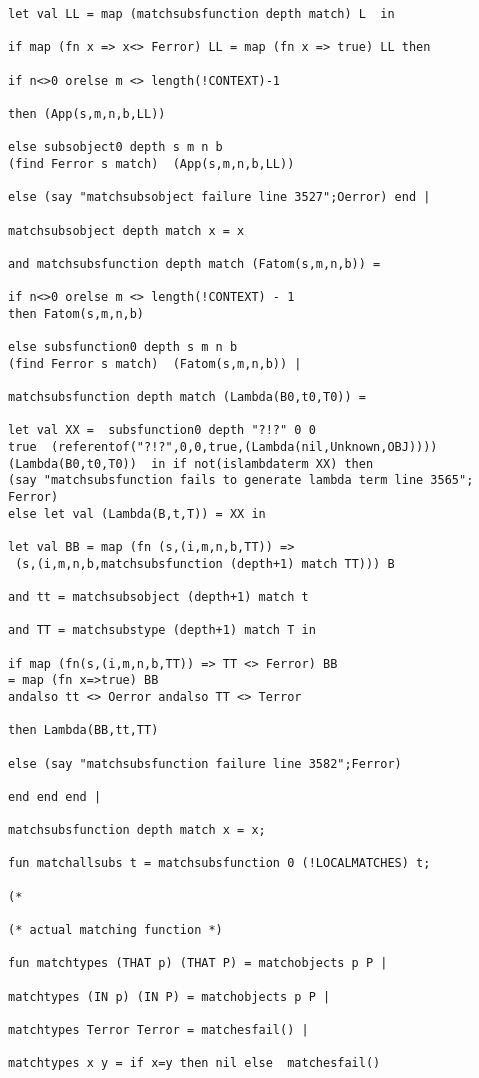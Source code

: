\documentclass[12pt]{article}
\begin{document}
\begin{verbatim}
let val LL = map (matchsubsfunction depth match) L  in

if map (fn x => x<> Ferror) LL = map (fn x => true) LL then

if n<>0 orelse m <> length(!CONTEXT)-1 

then (App(s,m,n,b,LL)) 

else subsobject0 depth s m n b 
(find Ferror s match)  (App(s,m,n,b,LL)) 

else (say "matchsubsobject failure line 3527";Oerror) end |

matchsubsobject depth match x = x

and matchsubsfunction depth match (Fatom(s,m,n,b)) =

if n<>0 orelse m <> length(!CONTEXT) - 1 
then Fatom(s,m,n,b)

else subsfunction0 depth s m n b 
(find Ferror s match)  (Fatom(s,m,n,b)) |

matchsubsfunction depth match (Lambda(B0,t0,T0)) =

let val XX =  subsfunction0 depth "?!?" 0 0 
true  (referentof("?!?",0,0,true,(Lambda(nil,Unknown,OBJ))))
(Lambda(B0,t0,T0))  in if not(islambdaterm XX) then  
(say "matchsubsfunction fails to generate lambda term line 3565";
Ferror)
else let val (Lambda(B,t,T)) = XX in

let val BB = map (fn (s,(i,m,n,b,TT)) =>
 (s,(i,m,n,b,matchsubsfunction (depth+1) match TT))) B

and tt = matchsubsobject (depth+1) match t

and TT = matchsubstype (depth+1) match T in

if map (fn(s,(i,m,n,b,TT)) => TT <> Ferror) BB 
= map (fn x=>true) BB
andalso tt <> Oerror andalso TT <> Terror

then Lambda(BB,tt,TT)

else (say "matchsubsfunction failure line 3582";Ferror)

end end end |

matchsubsfunction depth match x = x;

fun matchallsubs t = matchsubsfunction 0 (!LOCALMATCHES) t;

(*

(* actual matching function *)

fun matchtypes (THAT p) (THAT P) = matchobjects p P |

matchtypes (IN p) (IN P) = matchobjects p P |

matchtypes Terror Terror = matchesfail() |

matchtypes x y = if x=y then nil else  matchesfail()




\end{verbatim}
\end{document}
